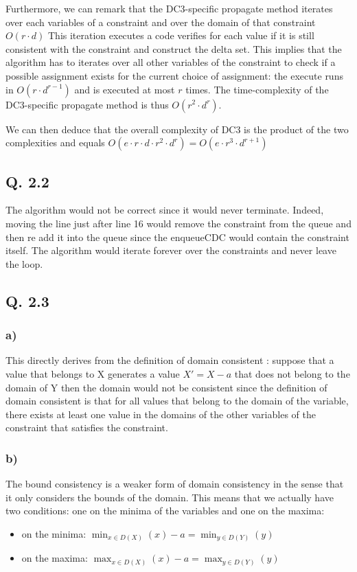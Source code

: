 \documentclass[a4paper ,12pt,french]{article}
\begin{document}
Furthermore, we can remark that the DC3-specific propagate method iterates over each variables of a constraint and over the domain of that constraint $O(r\cdot d)$ This iteration executes a code verifies for each value if it is still consistent with the constraint and construct the delta set. This implies that the algorithm has to iterates over all other variables of the constraint to check if a possible assignment exists for the current choice of assignment: the execute runs in $O(r\cdot d^{r-1})$ and is executed at most $r$ times. The time-complexity of the DC3-specific propagate method is thus $O(r^2 \cdot d^{r})$.

We can then deduce that the overall complexity of DC3 is the product of the two complexities and equals $O(e\cdot r\cdot d\cdot r^2\cdot d^{r}) = O(e\cdot r^3 \cdot d^{r+1})$
\subsection{Q. 2.2}
The algorithm would not be correct since it would never terminate. Indeed, moving the line just after line 16 would remove the constraint from the queue and then re add it into the queue since the enqueueCDC would contain the constraint itself. The algorithm would iterate forever over the constraints and never leave the loop. 
\subsection{Q. 2.3}
\subsubsection{a)}
This directly derives from the definition of domain consistent : suppose that a value that belongs to X generates a value $X' = X - a$ that does not belong to the domain of Y then the domain would not be consistent since the definition of domain consistent is that for all values that belong to the domain of the variable, there exists at least one value in the domains of the other variables of the constraint that satisfies the constraint. 
\subsubsection{b)}
The bound consistency is a weaker form of domain consistency in the sense that it only considers the bounds of the domain. This means that we actually have two conditions: one on the minima of the variables and one on the maxima: \begin{itemize}
\item on the minima: $\min_{x\in D(X)}(x) - a = \min_{y\in D(Y)}(y)$
\item on the maxima: $\max_{x\in D(X)}(x) - a = \max_{y\in D(Y)}(y)$
\end{itemize}
\end{document}
